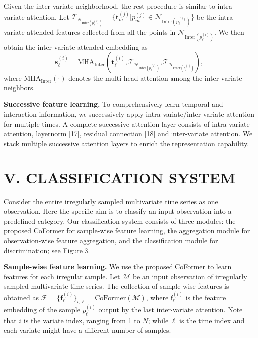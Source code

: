 \documentclass[twocolumn]{article}
\begin{document}
Given the inter-variate neighborhood, the rest procedure is similar to intra-variate attention. Let $\mathcal{T}_{\mathcal{N}_{\text{Inter}(p_\ell^{(i)})}} = \{\mathbf{t}_m^{(j)} | p_m^{(j)} \in \mathcal{N}_{\text{Inter}(p_\ell^{(i)})}\}$ be the intra-variate-attended features collected from all the points in $\mathcal{N}_{\text{Inter}(p_\ell^{(i)})}$. We then obtain the inter-variate-attended embedding as
\begin{equation}
    \mathbf{s}_\ell^{(i)} = \text{MHA}_{\text{Inter}}(\mathbf{t}_\ell^{(i)}, \mathcal{T}_{\mathcal{N}_{\text{Inter}(p_\ell^{(i)})}}, \mathcal{T}_{\mathcal{N}_{\text{Inter}(p_\ell^{(i)})}}),
\end{equation}
where $\text{MHA}_{\text{Inter}}(\cdot)$ denotes the multi-head attention among the inter-variate neighbors.

\textbf{Successive feature learning.} To comprehensively learn temporal and interaction information, we successively apply intra-variate/inter-variate attention for multiple times. A complete successive attention layer consists of intra-variate attention, layernorm [17], residual connection [18] and inter-variate attention. We stack multiple successive attention layers to enrich the representation capability.

\section{V. CLASSIFICATION SYSTEM}
Consider the entire irregularly sampled multivariate time series as one observation. Here the specific aim is to classify an input observation into a predefined category. Our classification system consists of three modules: the proposed CoFormer for sample-wise feature learning, the aggregation module for observation-wise feature aggregation, and the classification module for discrimination; see Figure 3.

\textbf{Sample-wise feature learning.} We use the proposed CoFormer to learn features for each irregular sample. Let $\mathcal{M}$ be an input observation of irregularly sampled multivariate time series. The collection of sample-wise features is obtained as $\mathcal{F} = \{\mathbf{f}_\ell^{(i)}\}_{i, \ell} = \text{CoFormer}(\mathcal{M})$, where $\mathbf{f}_\ell^{(i)}$ is the feature embedding of the sample $p_\ell^{(i)}$ output by the last inter-variate attention. Note that $i$ is the variate index, ranging from 1 to $N$; while $\ell$ is the time index and each variate might have a different number of samples.
\end{document}

